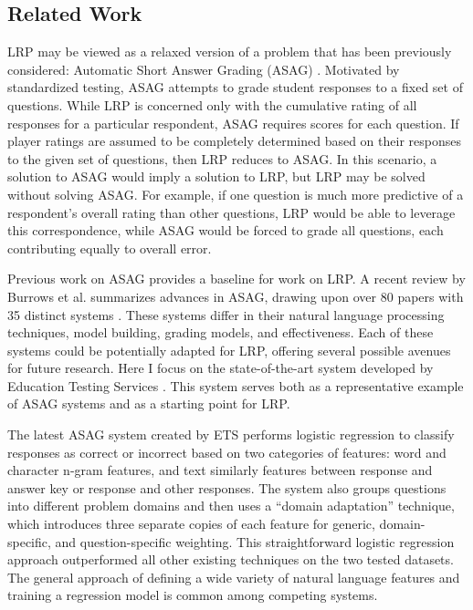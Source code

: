 \subsection{Related Work}
LRP may be viewed as a relaxed version of a problem that has been previously considered: Automatic Short Answer Grading (ASAG)  \citep{burrows2015eras, pulman2005automatic, sukkarieh2009c, ziai2012short}. Motivated by standardized testing, ASAG attempts to grade student responses to a fixed set of questions. While LRP is concerned only with the cumulative rating of all responses for a particular respondent, ASAG requires scores for each question. If player ratings are assumed to be completely determined based on their responses to the given set of questions, then LRP reduces to ASAG. In this scenario, a solution to ASAG would imply a solution to LRP, but LRP may be solved without solving ASAG. For example, if one question is much more predictive of a respondent's overall rating than other questions, LRP would be able to leverage this correspondence, while ASAG would be forced to grade all questions, each contributing equally to overall error. 

Previous work on ASAG provides a baseline for work on LRP. A recent review by Burrows et al. summarizes advances in ASAG, drawing upon over 80 papers with 35 distinct systems  \citep{burrows2015eras}. These systems differ in their natural language processing techniques, model building, grading models, and effectiveness. Each of these systems could be potentially adapted for LRP, offering several possible avenues for future research. Here I focus on the state-of-the-art system developed by Education Testing Services  \citep{heilman2013ets}. This system serves both as a representative example of ASAG systems and as a starting point for LRP.

The latest ASAG system created by ETS performs logistic regression to classify responses as correct or incorrect based on two categories of features: word and character n-gram features, and text similarly features between response and answer key or response and other responses. The system also groups questions into different problem domains and then uses a ``domain adaptation'' technique, which introduces three separate copies of each feature for generic, domain-specific, and question-specific weighting. This straightforward logistic regression approach outperformed all other existing techniques on the two tested datasets. The general approach of defining a wide variety of natural language features and training a regression model is common among competing systems.

